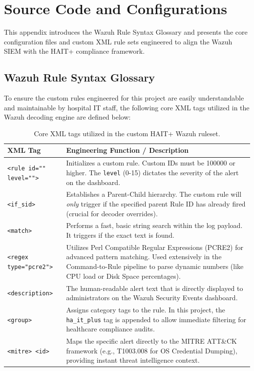 \chapter{Source Code and Configurations}
\label{app:source-code}

This appendix introduces the Wazuh Rule Syntax Glossary and presents the core configuration files and custom XML rule sets engineered to align the Wazuh SIEM with the HAIT+ compliance framework.

\section{Wazuh Rule Syntax Glossary}
\label{app:syntax-glossary}
To ensure the custom rules engineered for this project are easily understandable and maintainable by hospital IT staff, the following core XML tags utilized in the Wazuh decoding engine are defined below:

\begin{table}[h!]
    \centering
    \renewcommand{\arraystretch}{1.3}
    \begin{tabular}{|p{}|p{}|}
        \hline
        \textbf{XML Tag} & \textbf{Engineering Function / Description} \\
        \hline
        \texttt{<rule id="" level="">} & Initializes a custom rule. Custom IDs must be 100000 or higher. The \texttt{level} (0-15) dictates the severity of the alert on the dashboard. \\
        \hline
        \texttt{<if\_sid>} & Establishes a Parent-Child hierarchy. The custom rule will \textit{only} trigger if the specified parent Rule ID has already fired (crucial for decoder overrides). \\
        \hline
        \texttt{<match>} & Performs a fast, basic string search within the log payload. It triggers if the exact text is found. \\
        \hline
        \texttt{<regex type="pcre2">} & Utilizes Perl Compatible Regular Expressions (PCRE2) for advanced pattern matching. Used extensively in the Command-to-Rule pipeline to parse dynamic numbers (like CPU load or Disk Space percentages). \\
        \hline
        \texttt{<description>} & The human-readable alert text that is directly displayed to administrators on the Wazuh Security Events dashboard. \\
        \hline
        \texttt{<group>} & Assigns category tags to the rule. In this project, the \texttt{ha\_it\_plus} tag is appended to allow immediate filtering for healthcare compliance audits. \\
        \hline
        \texttt{<mitre> \textless id\textgreater} & Maps the specific alert directly to the MITRE ATT\&CK framework (e.g., T1003.008 for OS Credential Dumping), providing instant threat intelligence context. \\
        \hline
    \end{tabular}
    \caption{Core XML tags utilized in the custom HAIT+ Wazuh ruleset.}
    \label{tab:xml_glossary}
\end{table}
